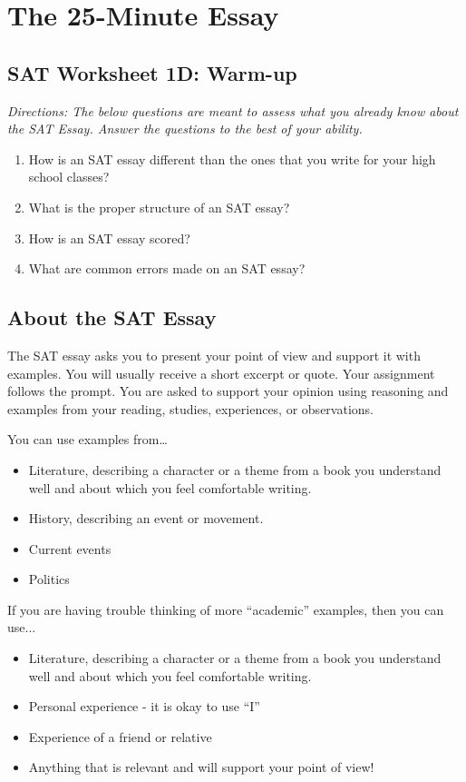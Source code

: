 \documentclass[12pt]{book}
\begin{document}
\chapter{The 25-Minute Essay}
\section{SAT Worksheet 1D: Warm-up}
\textit{Directions: The below questions are meant to assess what you already know about the SAT Essay. Answer the questions to the best of your ability. }\\

\begin{enumerate}
\item{How is an SAT essay different than the ones that you write for your high school classes?}


\vfill
\item{What is the proper structure of an SAT essay?}


\vfill
\item{How is an SAT essay scored?}


\vfill
\item{What are common errors made on an SAT essay?}

\end{enumerate}
\vfill

\pagebreak
\section{About the SAT Essay}
The SAT essay asks you to present your point of view and support it with examples.  You will usually receive a short excerpt or quote.  Your assignment follows the prompt.  You are asked to support your opinion using reasoning and examples from your reading, studies, experiences, or observations.

\bigskip
You can use examples from…
\begin{itemize}
\item{Literature, describing a character or a theme from a book you understand well and about which you feel comfortable writing.}  
\item{History, describing an event or movement.}
\item{Current events}
\item{Politics}
\end{itemize}

\bigskip
If you are having trouble thinking of more “academic” examples, then you can use...
\begin{itemize}
\item{Literature, describing a character or a theme from a book you understand well and about which you feel comfortable writing.}  
\item{Personal experience - it is okay to use “I”}
\item{Experience of a friend or relative}
\item{Anything that is relevant and will support your point of view!}
\end{itemize}
\end{document}
